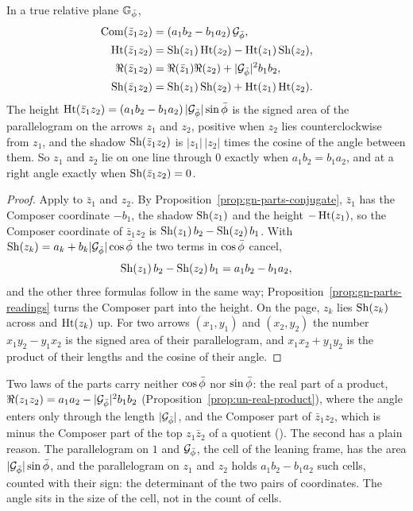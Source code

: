 \begin{proposition}\label{prop:gn-signed-area}
In a true relative plane $\mathbb{G}_{\bar{\phi}}$,
\begin{align*}
\operatorname{Com}(\bar{z}_1z_2) &= (a_1b_2 - b_1a_2)\,\mathcal{G}_{\bar{\phi}} , \\
\operatorname{Ht}(\bar{z}_1z_2) &= \operatorname{Sh}(z_1)\operatorname{Ht}(z_2) - \operatorname{Ht}(z_1)\operatorname{Sh}(z_2) , \\
\Re(\bar{z}_1z_2) &= \Re(\bar{z}_1)\Re(z_2) + |\mathcal{G}_{\bar{\phi}}|^2 b_1b_2 , \\
\operatorname{Sh}(\bar{z}_1z_2) &= \operatorname{Sh}(z_1)\operatorname{Sh}(z_2) + \operatorname{Ht}(z_1)\operatorname{Ht}(z_2) .
\end{align*}
The height $\operatorname{Ht}(\bar{z}_1z_2) = (a_1b_2 - b_1a_2)\,|\mathcal{G}_{\bar{\phi}}|\sin\bar{\phi}$ is the signed area of the parallelogram on the arrows $z_1$ and $z_2$, positive when $z_2$ lies counterclockwise from $z_1$, and the shadow $\operatorname{Sh}(\bar{z}_1z_2)$ is $|z_1|\,|z_2|$ times the cosine of the angle between them. So $z_1$ and $z_2$ lie on one line through $0$ exactly when $a_1b_2 = b_1a_2$, and at a right angle exactly when $\operatorname{Sh}(\bar{z}_1z_2) = 0$.
\end{proposition}

\begin{proof}
Apply  to $\bar{z}_1$ and $z_2$. By Proposition~\ref{prop:gn-parts-conjugate}, $\bar{z}_1$ has the Composer coordinate $-b_1$, the shadow $\operatorname{Sh}(z_1)$ and the height $-\operatorname{Ht}(z_1)$, so the Composer coordinate of $\bar{z}_1z_2$ is $\operatorname{Sh}(z_1)\,b_2 - \operatorname{Sh}(z_2)\,b_1$. With $\operatorname{Sh}(z_k) = a_k + b_k|\mathcal{G}_{\bar{\phi}}|\cos\bar{\phi}$ the two terms in $\cos\bar{\phi}$ cancel,
\[
\operatorname{Sh}(z_1)\,b_2 - \operatorname{Sh}(z_2)\,b_1 = a_1b_2 - b_1a_2 ,
\]
and the other three formulas follow in the same way; Proposition~\ref{prop:gn-parts-readings} turns the Composer part into the height. On the page, $z_k$ lies $\operatorname{Sh}(z_k)$ across and $\operatorname{Ht}(z_k)$ up. For two arrows $(x_1, y_1)$ and $(x_2, y_2)$ the number $x_1y_2 - y_1x_2$ is the signed area of their parallelogram, and $x_1x_2 + y_1y_2$ is the product of their lengths and the cosine of their angle.
\end{proof}

Two laws of the parts carry neither $\cos\bar{\phi}$ nor $\sin\bar{\phi}$: the real part of a product, $\Re(z_1z_2) = a_1a_2 - |\mathcal{G}_{\bar{\phi}}|^2b_1b_2$ (Proposition~\ref{prop:un-real-product}), where the angle enters only through the length $|\mathcal{G}_{\bar{\phi}}|$, and the Composer part of $\bar{z}_1z_2$, which is minus the Composer part of the top $z_1\bar{z}_2$ of a quotient (). The second has a plain reason. The parallelogram on $1$ and $\mathcal{G}_{\bar{\phi}}$, the cell of the leaning frame, has the area $|\mathcal{G}_{\bar{\phi}}|\sin\bar{\phi}$, and the parallelogram on $z_1$ and $z_2$ holds $a_1b_2 - b_1a_2$ such cells, counted with their sign: the determinant of the two pairs of coordinates. The angle sits in the size of the cell, not in the count of cells.

